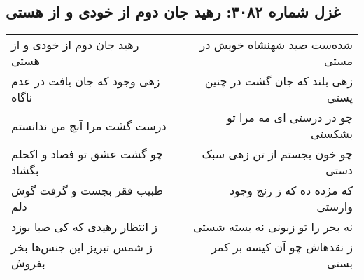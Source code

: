 \begin{center}
\section*{غزل شماره ۳۰۸۲: رهید جان دوم از خودی و از هستی}
\label{sec:3082}
\begin{longtable}{l p{0.5cm} r}
رهید جان دوم از خودی و از هستی
&&
شده‌ست صید شهنشاه خویش در مستی
\\
زهی وجود که جان یافت در عدم ناگاه
&&
زهی بلند که جان گشت در چنین پستی
\\
درست گشت مرا آنچ من ندانستم
&&
چو در درستی ای مه مرا تو بشکستی
\\
چو گشت عشق تو فصاد و اکحلم بگشاد
&&
چو خون بجستم از تن زهی سبک دستی
\\
طبیب فقر بجست و گرفت گوش دلم
&&
که مژده ده که ز رنج وجود وارستی
\\
ز انتظار رهیدی که کی صبا بوزد
&&
نه بحر را تو زبونی نه بسته شستی
\\
ز شمس تبریز این جنس‌ها بخر بفروش
&&
ز نقدهاش چو آن کیسه بر کمر بستی
\\
\end{longtable}
\end{center}
